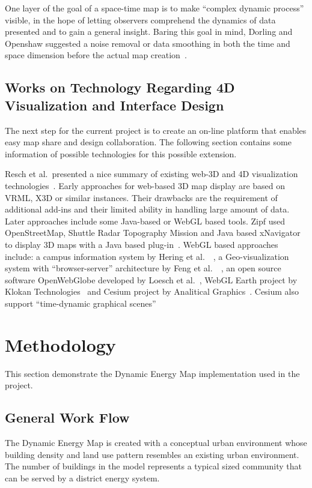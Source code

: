 \documentclass[hidelinks,12pt]{article}
\begin{document}
One layer of the goal of a space-time map is to make ``complex dynamic
process'' visible, in the hope of letting observers comprehend the
dynamics of data presented and to gain a general insight. Baring this
goal in mind, Dorling and Openshaw suggested a noise removal or data
smoothing in both the time and space dimension before the actual map
creation~\cite{Dorling1992}.

\subsection{Works on Technology Regarding 4D Visualization and
  Interface Design}\label{4dMap}
The next step for the current project is to create an on-line platform
that enables easy map share and design collaboration. The following
section contains some information of possible technologies for this
possible extension.

Resch et al.\ presented a nice summary of existing web-3D and 4D
visualization technologies~\cite{Resch2014}. Early approaches for
web-based 3D map display are based on VRML, X3D or similar
instances. Their drawbacks are the requirement of additional add-ins
and their limited ability in handling large amount of data. Later
approaches include some Java-based or WebGL based tools. Zipf used
OpenStreetMap, Shuttle Radar Topography Mission and Java based
xNavigator to display 3D maps with a Java based
plug-in~\cite{Zipf2014}. WebGL based approaches include: a campus
information system by Hering et al.\ ~\cite{Hering2011}, a
Geo-visualization system with ``browser-server'' architecture by Feng
et al.\ ~\cite{Feng2011}, an open source software OpenWebGlobe
developed by Loesch et al.\ , WebGL Earth project by Klokan
Technologies~\cite{KlokanTechnologies2015} and Cesium project by
Analitical Graphics~\cite{AGI2015}. Cesium also support ``time-dynamic
graphical scenes''~\cite{CZML2015}

\newpage
\section{Methodology}\label{method}
This section demonstrate the Dynamic Energy Map implementation used in
the project.

\subsection{General Work Flow}
The Dynamic Energy Map is created with a conceptual urban environment
whose building density and land use pattern resembles an existing
urban environment. The number of buildings in the model represents a
typical sized community that can be served by a district energy
system. 
\end{document}

